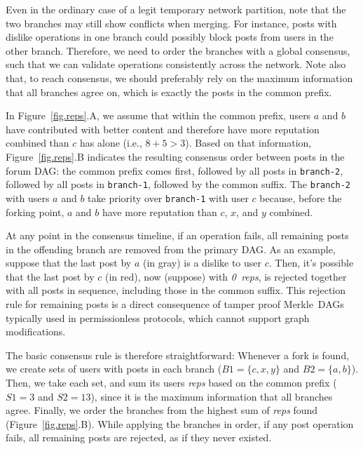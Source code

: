 \documentclass[12pt]{article}
\newcommand{\reps}     {\emph{reps}\xspace}
\newcommand{\nreps}[1] {\emph{#1~reps\xspace}}
\newcommand{\code}[1]  {\texttt{\footnotesize{#1}}}
\begin{document}
Even in the ordinary case of a legit temporary network partition, note that the
two branches may still show conflicts when merging.
For instance, posts with dislike operations in one branch could possibly block
posts from users in the other branch.
Therefore, we need to order the branches with a global consensus, such that we
can validate operations consistently across the network.
%
Note also that, to reach consensus, we should preferably rely on the maximum
information that all branches agree on, which is exactly the posts in the
common prefix.

In Figure~\ref{fig.reps}.A, we assume that within the common prefix, users $a$
and $b$ have contributed with better content and therefore have more reputation
combined than $c$ has alone (i.e., $8+5>3$).
%
Based on that information, Figure~\ref{fig.reps}.B indicates the resulting
consensus order between posts in the forum DAG:
    the common prefix comes first,
    followed by all posts in \code{branch-2},
    followed by all posts in \code{branch-1},
    followed by the common suffix.
%
The \code{branch-2} with users $a$ and $b$ take priority over \code{branch-1}
with user $c$ because, before the forking point, $a$ and $b$ have more
reputation than $c$, $x$, and $y$ combined.

At any point in the consensus timeline, if an operation fails, all remaining
posts in the offending branch are removed from the primary DAG.
As an example, suppose that the last post by $a$ (in gray) is a dislike to user
$c$.
Then, it's possible that the last post by $c$ (in red), now (suppose) with
\nreps{0}, is rejected together with all posts in sequence, including those in
the common suffix.
%
This rejection rule for remaining posts is a direct consequence of tamper proof
Merkle~DAGs~\cite{p2p.ipfs,p2p.bitcoin} typically used in permissionless
protocols, which cannot support graph modifications.

The basic consensus rule is therefore straightforward:
Whenever a fork is found, we create sets of users with posts in each branch
($B1=\{c,x,y\}$ and $B2=\{a,b\}$).
Then, we take each set, and sum its users \reps based on the common prefix
($S1=3$ and $S2=13$), since it is the maximum information that all branches
agree.
Finally, we order the branches from the highest sum of \reps found
(Figure~\ref{fig.reps}.B).
While applying the branches in order, if any post operation fails, all
remaining posts are rejected, as if they never existed.
\end{document}
